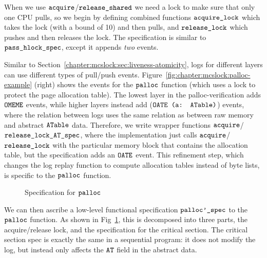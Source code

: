 When we use ${\mathrm{\texttt{acquire}}}$/${\mathrm{\texttt{release\_shared}}}$ we
need a lock to make sure that only one CPU pulls, so we begin
by defining combined functions ${\mathrm{\texttt{acquire\_lock}}}$ which
takes the lock (with a bound of 10) and then pulls, and
${\mathrm{\texttt{release\_lock}}}$ which pushes and then releases the
lock. The specification is similar to ${\mathrm{\texttt{pass\_hlock\_spec}}}$,
except it appends \emph{two} events.

Similar to Section~\ref{chapter:mcslock:sec:liveness-atomicity}, logs for different
layers can use different types of pull/push events.
Figure~\ref{fig:chapter:mcslock:palloc-example} (right) shows the events for the
${\mathrm{\texttt{palloc}}}$ function (which uses a lock to protect the page
allocation table). The lowest layer in the palloc-verification adds
${\mathrm{\texttt{OMEME}}}$ events, while higher layers instead add
(${\mathrm{\texttt{OATE (a: ATable)}}}$) events, where the relation between logs
uses the same relation as between raw memory and abstract
${\mathrm{\texttt{ATable}}}$ data. Therefore, we write wrapper functions
${\mathrm{\texttt{acquire}}}$/${\mathrm{\texttt{release\_lock\_AT\_spec}}}$, where the
implementation just calls ${\mathrm{\texttt{acquire}}}$/${\mathrm{\texttt{release\_lock}}}$
with the particular memory block that contains the allocation table,
but the specification adds an ${\mathrm{\texttt{OATE}}}$ event.
This refinement step, which changes the log replay function to compute
allocation tables instead of byte lists, is
specific to the ${\mathrm{\texttt{palloc}}}$ function.

\begin{figure}




\caption{Specification for ${\mathrm{\texttt{palloc}}}$}
\label{fig:chapter:mcslock:palloc-spec}
\end{figure}

We can then ascribe a low-level functional specification
${\mathrm{\texttt{palloc'\_spec}}}$ to the ${\mathrm{\texttt{palloc}}}$ function. As shown
in Fig~\ref{fig:chapter:mcslock:palloc-spec}, this is decomposed into three parts, the
acquire/release lock, and the specification for the critical
section. The critical section spec is exactly the same in a sequential
program: it does not modify the log, but instead only affects the ${\mathrm{\texttt{AT}}}$ field in the abstract data.

